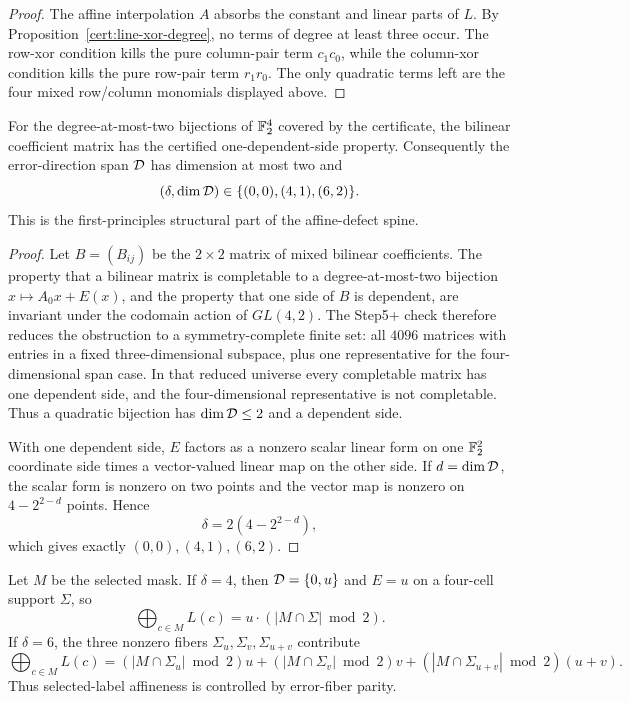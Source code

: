 \begin{proof}
The affine interpolation \(A\) absorbs the constant and linear parts of \(L\).
By Proposition~\ref{cert:line-xor-degree}, no terms of degree at least three
occur.  The row-xor condition kills the pure column-pair term \(c_1c_0\), while
the column-xor condition kills the pure row-pair term \(r_1r_0\).  The only
quadratic terms left are the four mixed row/column monomials displayed above.
\end{proof}

\begin{theorem}
\label{thm:defect-dichotomy}
For the degree-at-most-two bijections of \(\mathbb F_2^4\) covered by the certificate,
the bilinear coefficient matrix has the certified one-dependent-side property.
Consequently the error-direction span \(\mathcal D\) has dimension at most two and
\[
  (\delta,\dim\mathcal D)\in\{(0,0),(4,1),(6,2)\}.
\]
This is the first-principles structural part of the affine-defect spine.
\end{theorem}

\begin{proof}
Let \(B=(B_{ij})\) be the \(2\times2\) matrix of mixed bilinear coefficients.
The property that a bilinear matrix is completable to a degree-at-most-two
bijection \(x\mapsto A_0x+E(x)\), and the property that one side of \(B\) is
dependent, are invariant under the codomain action of \(GL(4,2)\).  The
Step5+ check therefore reduces the obstruction to a symmetry-complete finite
set: all \(4096\) matrices with entries in a fixed three-dimensional subspace,
plus one representative for the four-dimensional span case.  In that reduced
universe every completable matrix has one dependent side, and the
four-dimensional representative is not completable.  Thus a quadratic
bijection has \(\dim\mathcal D\le2\) and a dependent side.

With one dependent side, \(E\) factors as a nonzero scalar linear form on one
\(\mathbb F_2^2\) coordinate side times a vector-valued linear map on the other side.
If \(d=\dim\mathcal D\), the scalar form is nonzero on two points and the vector map
is nonzero on \(4-2^{2-d}\) points.  Hence
\[
  \delta=2(4-2^{2-d}),
\]
which gives exactly \((0,0),(4,1),(6,2)\).
\end{proof}

\begin{lemma}
\label{lem:error-fiber-parity}
Let \(M\) be the selected mask.  If \(\delta=4\), then
\(\mathcal D=\{0,u\}\) and \(E=u\) on a four-cell support \(\Sigma\), so
\[
  \bigoplus_{c\in M} L(c)=u\cdot(|M\cap\Sigma|\bmod 2).
\]
If \(\delta=6\), the three nonzero fibers
\(\Sigma_u,\Sigma_v,\Sigma_{u+v}\) contribute
\[
  \bigoplus_{c\in M}L(c)=
  (|M\cap\Sigma_u|\bmod2)u+
  (|M\cap\Sigma_v|\bmod2)v+
  (|M\cap\Sigma_{u+v}|\bmod2)(u+v).
\]
Thus selected-label affineness is controlled by error-fiber parity.
\end{lemma}

